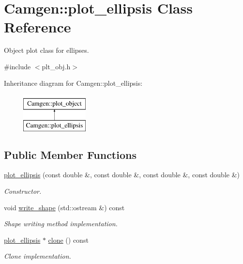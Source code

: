 \hypertarget{a00423}{\section{Camgen\-:\-:plot\-\_\-ellipsis Class Reference}
\label{a00423}
}


Object plot class for ellipses.  




{\ttfamily \#include $<$plt\-\_\-obj.\-h$>$}

Inheritance diagram for Camgen\-:\-:plot\-\_\-ellipsis\-:\begin{figure}[H]
\begin{center}
\leavevmode
\includegraphics[height=2.000000cm]{a00423}
\end{center}
\end{figure}
\subsection*{Public Member Functions}
\begin{DoxyCompactItemize}
\item 
\hypertarget{a00423_aef608d16271b3974d72729c2017a6ca4}{\hyperlink{a00423_aef608d16271b3974d72729c2017a6ca4}{plot\-\_\-ellipsis} (const double \&, const double \&, const double \&, const double \&)}\label{a00423_aef608d16271b3974d72729c2017a6ca4}

\begin{DoxyCompactList}\small\item\em Constructor. \end{DoxyCompactList}\item 
\hypertarget{a00423_a2f7ec9ba40fdbbd7dc48946798051671}{void \hyperlink{a00423_a2f7ec9ba40fdbbd7dc48946798051671}{write\-\_\-shape} (std\-::ostream \&) const }\label{a00423_a2f7ec9ba40fdbbd7dc48946798051671}

\begin{DoxyCompactList}\small\item\em Shape writing method implementation. \end{DoxyCompactList}\item 
\hypertarget{a00423_ae7012c8c0888b5941d69ab1da42eee6b}{\hyperlink{a00423}{plot\-\_\-ellipsis} $\ast$ \hyperlink{a00423_ae7012c8c0888b5941d69ab1da42eee6b}{clone} () const }\label{a00423_ae7012c8c0888b5941d69ab1da42eee6b}

\begin{DoxyCompactList}\small\item\em Clone implementation. \end{DoxyCompactList}\end{DoxyCompactItemize}

